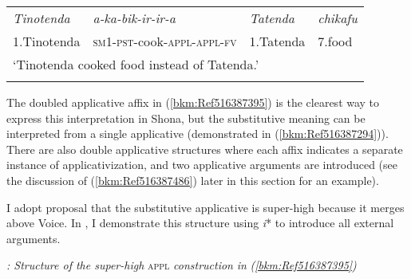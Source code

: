 \documentclass[output=paper,modfonts,nonflat]{langsci/langscibook}
\begin{document}
\tabletail{}
\tablelasttail{}
\begin{tabularx}{\textwidth}{XXXX}
\lsptoprule
{\itshape Tinotenda}  & \textit{a-ka-bik-ir-ir-a}                                  & \textit{Tatenda} & {\itshape chikafu}\\
1.Tinotenda & \textsc{sm1-pst}{}-cook-\textsc{appl-appl-fv} & 1.Tatenda & 7.food\\
\multicolumn{3}{X}{‘Tinotenda cooked food instead of Tatenda.’}  & \\
\lspbottomrule
\end{tabularx}
\begin{styleDefault}
The doubled applicative affix in (\ref{bkm:Ref516387395}) is the clearest way to express this interpretation in Shona,\textstyleFootnoteSymbol{} but the substitutive meaning can be interpreted from a single applicative (demonstrated in (\ref{bkm:Ref516387294})). There are also double applicative structures where each affix indicates a separate instance of applicativization, and two applicative arguments are introduced (see the discussion of (\ref{bkm:Ref516387486}) later in this section for an example). 
\end{styleDefault}

\begin{styleDefault}
I adopt  proposal that the substitutive applicative is super-high because it merges above Voice. In , I demonstrate this structure using \textit{i}* to introduce all external arguments.  
\end{styleDefault}

\begin{styleDefault}
  
 
\end{styleDefault}

\begin{styleDefault}
\textit{: Structure of the super-high} \textsc{appl} \textit{construction} \textit{in} \textit{(\ref{bkm:Ref516387395})}
\end{styleDefault}
\end{document}
